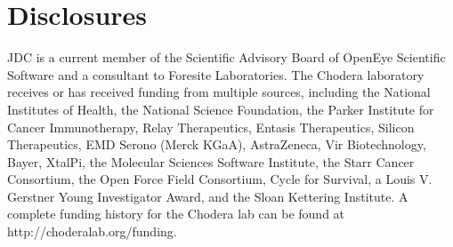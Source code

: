 \documentclass[../main.tex]{subfiles}
\begin{document}
    \section{Disclosures}
        JDC is a current member of the Scientific Advisory Board of OpenEye Scientific Software and a consultant to Foresite Laboratories. The Chodera laboratory receives or has received funding from multiple sources, including the National Institutes of Health, the National Science Foundation, the Parker Institute for Cancer Immunotherapy, Relay Therapeutics, Entasis Therapeutics, Silicon Therapeutics, EMD Serono (Merck KGaA), AstraZeneca, Vir Biotechnology, Bayer, XtalPi, the Molecular Sciences Software Institute, the Starr Cancer Consortium, the Open Force Field Consortium, Cycle for Survival, a Louis V. Gerstner Young Investigator Award, and the Sloan Kettering Institute. A complete funding history for the Chodera lab can be found at http://choderalab.org/funding.

    
% 
% 
\end{document}
